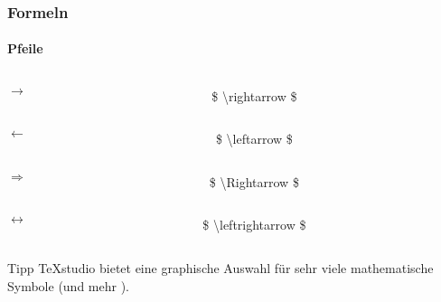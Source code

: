 \begin{frame}
\frametitle{Formeln}
\framesubtitle{Pfeile}

\bigskip


\begin{columns}
\begin{column}{.3\textwidth}
\centering
$ \rightarrow $
\end{column}
\begin{column}{.7\textwidth}
{\ttfamily \color{unibayellowI} \$ \color{nounibaredI}\textbackslash rightarrow \color{unibayellowI} \$ }
\end{column}
\end{columns}

\bigskip

\begin{columns}
\begin{column}{.3\textwidth}
\centering
$ \leftarrow $
\end{column}
\begin{column}{.7\textwidth}
{\ttfamily \color{unibayellowI} \$ \color{nounibaredI}\textbackslash leftarrow \color{unibayellowI} \$ }
\end{column}
\end{columns}

\bigskip

\begin{columns}
\begin{column}{.3\textwidth}
\centering
$ \Rightarrow $
\end{column}
\begin{column}{.7\textwidth}
{\ttfamily \color{unibayellowI} \$ \color{nounibaredI}\textbackslash Rightarrow \color{unibayellowI} \$ }
\end{column}
\end{columns}

\bigskip

\begin{columns}
\begin{column}{.3\textwidth}
\centering
$ \leftrightarrow $
\end{column}
\begin{column}{.7\textwidth}
{\ttfamily \color{unibayellowI} \$ \color{nounibaredI}\textbackslash leftrightarrow \color{unibayellowI} \$ }
\end{column}
\end{columns}

\bigskip

\begin{exampleblock}{Tipp}
\TeX studio bietet eine graphische Auswahl für sehr viele mathematische Symbole (und mehr \smiley).
\end{exampleblock}

\end{frame}

